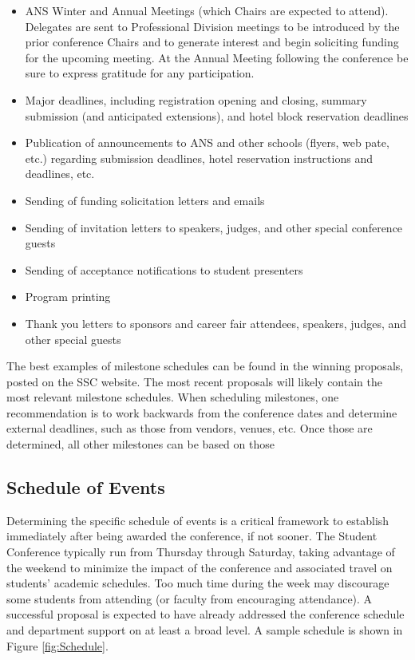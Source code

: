 \documentclass[12pt]{article}
\begin{document}
\begin{itemize}
    \item ANS Winter and Annual Meetings (which Chairs are expected to attend). Delegates are sent to Professional Division meetings to be introduced by the prior conference Chairs and to generate interest and begin soliciting funding for the upcoming meeting. At the Annual Meeting following the conference be sure to express gratitude for any participation.
    \item Major deadlines, including registration opening and closing, summary submission (and anticipated extensions), and hotel block reservation deadlines
    \item Publication of announcements to ANS and other schools (flyers, web pate, etc.) regarding submission deadlines, hotel reservation instructions and deadlines, etc.
    \item Sending of funding solicitation letters and emails
    \item Sending of invitation letters to speakers, judges, and other special conference guests
    \item Sending of acceptance notifications to student presenters
    \item Program printing
    \item Thank you letters to sponsors and career fair attendees, speakers, judges, and other special guests
\end{itemize}

The best examples of milestone schedules can be found in the winning proposals, posted on the SSC website.
The most recent proposals will likely contain the most relevant milestone schedules.
When scheduling milestones, one recommendation is to work backwards from the conference dates and determine external deadlines, such as those from vendors, venues, etc.
Once those are determined, all other milestones can be based on those

\subsection{Schedule of Events}
Determining the specific schedule of events is a critical framework to establish immediately after being awarded the conference, if not sooner.
The Student Conference typically run from Thursday through Saturday, taking advantage of the weekend to minimize the impact of the conference and associated travel on students' academic schedules.
Too much time during the week may discourage some students from attending (or faculty from encouraging attendance).
A successful proposal is expected to have already addressed the conference schedule and department support on at least a broad level.
A sample schedule is shown in Figure \ref{fig:Schedule}.
\end{document}
